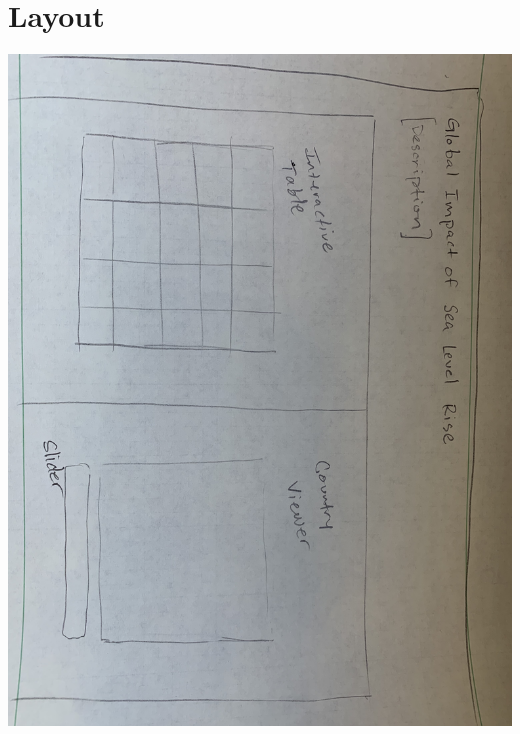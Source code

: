 \documentclass[12pt]{article}
\begin{document}
	\section{Layout}
		\includegraphics[scale=0.15]{figures/overview.jpg}
\end{document}

